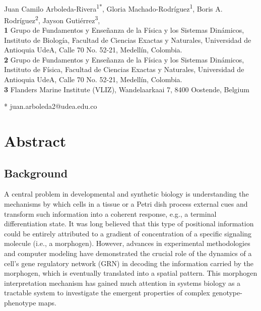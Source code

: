 \documentclass[10pt,letterpaper]{article}
\date{}
\begin{document}
\vspace*{0.2in}

\begin{flushleft}
{\Large
\textbf{}
}
\newline
\\
Juan Camilo Arboleda-Rivera\textsuperscript{1*},
Gloria Machado-Rodríguez\textsuperscript{1},
Boris A. Rodríguez\textsuperscript{2},
Jayson Gutiérrez\textsuperscript{3},
\\
\bigskip
\textbf{1} Grupo de Fundamentos y Enseñanza de la Física y los Sistemas Dinámicos,
Instituto de Biología, Facultad de Ciencias Exactas y Naturales, Universidad de Antioquia
UdeA, Calle 70 No. 52-21, Medellín, Colombia.
\\
\textbf{2} Grupo de Fundamentos y Enseñanza de la Física y los Sistemas Dinámicos,
Instituto de Física, Facultad de Ciencias Exactas y Naturales, Universidad de Antioquia
UdeA, Calle 70 No. 52-21, Medellín, Colombia.
\\
\textbf{3} Flanders Marine Institute (VLIZ), Wandelaarkaai 7, 8400 Oostende,
Belgium
\\
\bigskip

* juan.arboleda2@udea.edu.co

\end{flushleft}
\section*{Abstract}

\subsection*{Background}
A central problem in developmental and synthetic biology is understanding the
mechanisms by which cells in a tissue or a Petri dish process external cues
and transform such information into a coherent response, e.g., a terminal
differentiation state. It was long believed that this type of positional
information could be entirely attributed to a gradient of concentration of a
specific signaling molecule (i.e., a morphogen). However, advances in experimental
methodologies and computer modeling have demonstrated the crucial role of the
dynamics of a cell's gene regulatory network (GRN) in decoding the information
carried by the morphogen, which is eventually translated into a spatial
pattern. This morphogen interpretation mechanism has gained much attention
in systems biology as a tractable system to investigate the emergent properties
of complex genotype-phenotype maps.
\end{document}
